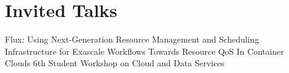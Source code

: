 \section{Invited Talks}
		{\newline Flux: Using Next-Generation Resource Management and Scheduling Infrastructure for Exascale Workflows}
		{}{}{}
		{\newline Towards Resource QoS In Container Clouds}
		{}{}{6th Student Workshop on Cloud and Data Services}

